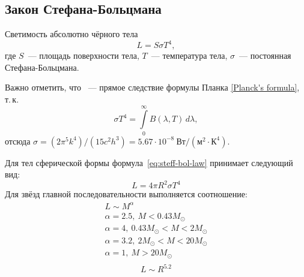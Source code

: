 \subsection{Закон Стефана-Больцмана}
Светимость абсолютно чёрного тела
	\begin{equation}
	L = S \sigma T^4,
	\label{eq:steff-bol-law}
\end{equation}
 где $S$~--- площадь поверхности тела, $T$~--- температура тела, $\sigma$~--- постоянная Стефана-Больцмана.
  
Важно отметить, что ~--- прямое следствие формулы Планка \eqref{Planck's formula}, т.\,к.\begin{equation}
	\sigma T^4 = \int\limits^\infty_0 B(\lambda, T)\,d\lambda,
\end{equation}
отсюда $\sigma = (2\pi^5k^4)/(15c^2h^3) = 5.67 \cdot 10^{-8}~\text{Вт}/(\text{м}^2\cdot \text{К}^4)$.


Для тел сферической формы формула~\eqref{eq:steff-bol-law} принимает следующий вид:
\begin{equation}
L=4\pi R^2\sigma T^4
\end{equation}
Для звёзд главной последовательности выполняется соотношение:
\begin{equation}
\begin{gathered}
L\sim M^{\alpha}\\ \alpha = 2.5, ~ M < 0.43 M_\odot\\ \alpha = 4, ~ 0.43 M_\odot < M < 2 M_\odot\\ \alpha = 3.2, ~ 2 M_\odot < M < 20 M_\odot\\ \alpha = 1, ~ M > 20 M_\odot\\
\end{gathered}
\end{equation}
\begin{equation}
L\sim R^{5.2}
\end{equation}
